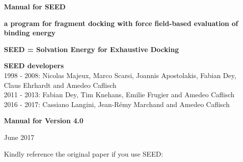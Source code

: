 \documentclass[a4paper,12pt,titlepage]{article}
\begin{document}




\appendix


\thispagestyle{empty}

\begin{center}


{\bf{\Huge Manual for SEED}}

{\bf a program for fragment docking with force field-based evaluation of binding energy}

\vspace{0.5cm}

{\bf{\large SEED = Solvation Energy for Exhaustive Docking}}

\vspace{1cm}

\end{center}

\vspace{2cm}
\noindent
{\bf SEED developers} \\
1998 - 2008: Nicolas Majeux, Marco Scarsi, Joannis Apostolakis, Fabian Dey, \\
\hspace*{2.2cm} Claus Ehrhardt and Amedeo Caflisch \\
2011 - 2013: Fabian Dey, Tim Knehans, Emilie Frugier and Amedeo Caflisch\\
2016 - 2017: Cassiano Langini, Jean-R\'{e}my Marchand and Amedeo Caflisch

\vspace{0.9cm}

\begin{center}
{\bf
Manual for Version 4.0

June 2017
}

\end{center}

\vspace{1cm}

\linespread{1.0}


\noindent
{\normalsize
Kindly reference the original paper if you use SEED:}
\end{document}
